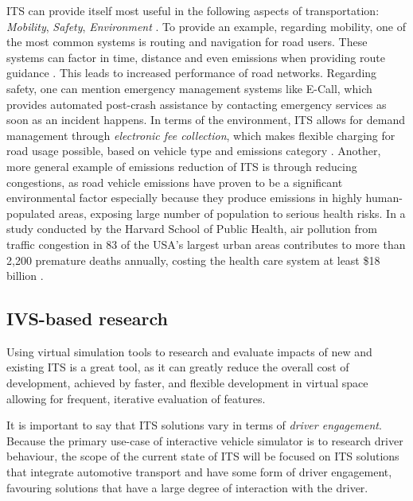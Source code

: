 \documentclass[main.tex]{subfiles}
\begin{document}
ITS can provide itself most useful in the following aspects of transportation: 
\emph{Mobility}, \emph{Safety}, \emph{Environment} \cite{Lishchenko2021}. To provide an example, regarding mobility, 
one of the most common systems is routing and navigation for road users. These systems can 
factor in time, distance and even emissions when providing route guidance \cite{Firmin2006}. This leads to 
increased performance of road networks. Regarding safety, one can mention emergency management
systems like E-Call, which provides automated post-crash assistance by contacting emergency
services as soon as an incident happens. In terms of the environment, 
ITS allows for demand management through \emph{electronic fee collection}, which makes flexible 
charging for road usage possible, based on vehicle type and emissions category \cite{Commision2022}.
Another, more general example of emissions reduction of ITS is through reducing congestions, as road vehicle 
emissions have proven to be a significant environmental factor especially because they produce emissions 
in highly human-populated areas, exposing large number of population to serious health risks. In a study conducted by the Harvard
School of Public Health, air pollution from traffic congestion in 83 of the USA's largest urban
areas contributes to more than 2,200 premature deaths annually, costing the health care system at
least \$18 billion \cite{Levy2011}.

\subsection{IVS-based research}

Using virtual simulation tools to research and evaluate impacts of new and existing ITS 
is a great tool, as it can greatly reduce the overall cost of development, achieved by faster, 
and flexible development in virtual space allowing for frequent, iterative evaluation of features.

It is important to say that ITS solutions vary in terms of \emph{driver engagement}. Because
the primary use-case of interactive vehicle simulator is to research driver behaviour, the 
scope of the current state of ITS will be focused on ITS solutions that integrate automotive 
transport and have some form of driver engagement, favouring solutions that have a large degree 
of interaction with the driver.
\end{document}
